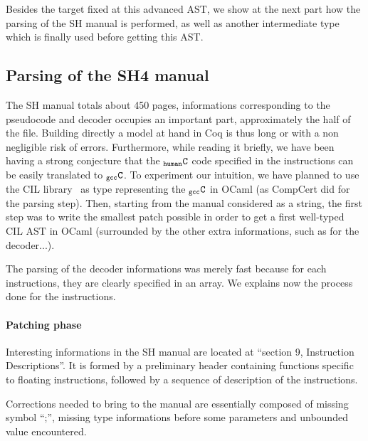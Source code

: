 \documentclass[a4paper, 11pt]{article}
\newcommand{\gccC}{$_{\tt gcc}{\tt C}$\xspace}
\newcommand{\hC}{$_{\tt human}{\tt C}$\xspace}
\begin{document}
Besides the target fixed at this advanced AST, we show at the next part how the parsing of the SH manual is performed, as well as another intermediate type which is finally used before getting this AST.


  \subsection{Parsing of the SH4 manual}
The SH manual totals about 450 pages, informations corresponding to the pseudocode and decoder occupies an important part, approximately the half of the file. Building directly a model at hand in Coq is thus long or with a non negligible risk of errors. 
Furthermore, while reading it briefly, we have been having a strong conjecture that the \hC code specified in the instructions can be easily translated to \gccC. To experiment our intuition, we have planned to use the CIL library~\cite{necula} as type representing the \gccC in OCaml (as CompCert did for the parsing step). Then, starting from the manual considered as a string, the first step was to write the smallest patch possible in order to get a first well-typed CIL AST in OCaml (surrounded by the other extra informations, such as for the decoder...).

The parsing of the decoder informations was merely fast because for each instructions, they are clearly specified in an array. We explains now the process done for the instructions.

\paragraph{Patching phase}

Interesting informations in the SH manual are located at ``section 9, Instruction Descriptions''. It is formed by a preliminary header containing functions specific to floating instructions, followed by a sequence of description of the instructions. 

Corrections needed to bring to the manual are essentially composed of missing symbol ``;'', missing type informations before some parameters and unbounded value encountered. 
\end{document}

